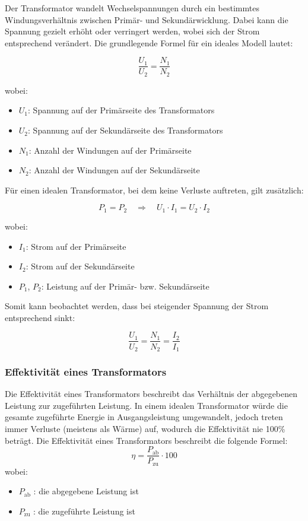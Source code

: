 	Der Transformator wandelt Wechselspannungen durch ein bestimmtes Windungsverhältnis zwischen Primär- und Sekundärwicklung. Dabei kann die Spannung gezielt erhöht oder verringert werden, wobei sich der Strom entsprechend verändert\cite{Rolink:2025}. 
	Die grundlegende Formel für ein ideales Modell lautet:
	
	
	\[
	\frac{U_1}{U_2} = \frac{N_1}{N_2}
	\]
	
	wobei:
	\begin{itemize}
		\item \(U_1\): Spannung auf der Primärseite des Transformators
		\item \(U_2\): Spannung auf der Sekundärseite des Transformators
		\item \(N_1\): Anzahl der Windungen auf der Primärseite
		\item \(N_2\): Anzahl der Windungen auf der Sekundärseite
	\end{itemize}
	
	Für einen idealen Transformator, bei dem keine Verluste auftreten, gilt zusätzlich:
	
	\[
	P_1 = P_2 \quad \Rightarrow \quad U_1 \cdot I_1 = U_2 \cdot I_2
	\]
	
	wobei:
	\begin{itemize}
		\item \(I_1\): Strom auf der Primärseite
		\item \(I_2\): Strom auf der Sekundärseite
		\item \(P_1\), \(P_2\): Leistung auf der Primär- bzw. Sekundärseite
	\end{itemize}
	
	Somit kann beobachtet werden, dass bei steigender Spannung der Strom entsprechend sinkt:
	
	\[
	\frac{U_1}{U_2} = \frac{N_1}{N_2} = \frac{I_2}{I_1}
	\]
	
	
	\subsubsection{Effektivität eines Transformators}
	Die Effektivität eines Transformators beschreibt das Verhältnis der abgegebenen Leistung zur zugeführten Leistung. In einem idealen Transformator würde die gesamte zugeführte Energie in Ausgangsleistung umgewandelt, jedoch treten immer Verluste (meistens als Wärme) auf, wodurch die Effektivität nie 100\% beträgt.
	Die Effektivität eines Transformators beschreibt die folgende Formel:
	\[
	\eta = \frac{P_{\text{ab}}}{P_{\text{zu}}} \cdot 100
	\]
	wobei:
	\begin{itemize}
		\item \(P_{\text{ab}}\) : die abgegebene Leistung ist
		\item \(P_{\text{zu}}\) : die zugeführte Leistung ist
	\end{itemize}
	

